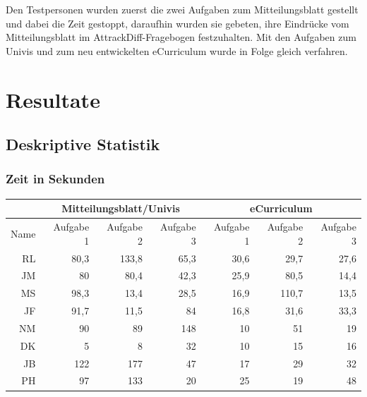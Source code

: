 \documentclass[a4paper,10pt]{scrartcl}
\begin{document}
Den Testpersonen wurden zuerst die zwei Aufgaben zum Mitteilungsblatt gestellt und dabei die Zeit gestoppt, daraufhin wurden sie gebeten, ihre Eindrücke vom Mitteilungsblatt im AttrackDiff-Fragebogen festzuhalten. Mit den Aufgaben zum Univis und zum neu entwickelten eCurriculum wurde in Folge gleich verfahren.

\section{Resultate} 

\subsection{Deskriptive Statistik}

\subsubsection*{Zeit in Sekunden} 

\begin{center}
\begin{tabular}{r|r|r|r|r|r|r}
     & \multicolumn{3}{c|}{Mitteilungsblatt/Univis} & \multicolumn{3}{c}{eCurriculum} \\ \hline
    Name & Aufgabe 1 & Aufgabe 2 & Aufgabe 3 & Aufgabe 1 & Aufgabe 2 & Aufgabe 3  \\ \hline
    RL & 80,3 & 133,8 & 65,3 & 30,6 & 29,7 & 27,6 \\ \hline
    JM & 80 & 80,4 & 42,3 & 25,9 & 80,5 & 14,4 \\ \hline
    MS & 98,3 & 13,4 & 28,5 & 16,9 & 110,7 & 13,5 \\ \hline
    JF & 91,7 & 11,5 & 84 & 16,8 & 31,6 & 33,3 \\ \hline
    NM & 90 & 89 & 148 & 10 & 51 & 19\\ \hline
    DK & 5 & 8 & 32 & 10 & 15 & 16\\ \hline
    JB & 122 & 177 & 47 & 17 & 29 & 32 \\ \hline
    PH & 97 & 133 & 20 & 25 & 19 & 48 \\
\end{tabular}
\end{center}
\end{document}
